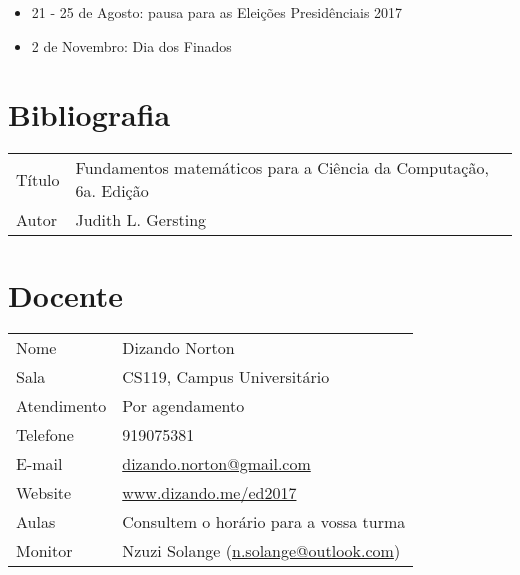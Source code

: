 \begin{itemize}
  \item 21 - 25 de Agosto: pausa para as Eleições Presidênciais 2017
  \item 2 de Novembro: Dia dos Finados
\end{itemize}

\section*{Bibliografia}

\begin{table}[H]
	\begin{tabular}{ll}%
		Título & Fundamentos matemáticos para a Ciência da Computação, 6a. Edição\\
		Autor & Judith L. Gersting\\
	\end{tabular}
\end{table}

\section*{Docente}

\begin{table}[H]
	\begin{tabular}{ll}%
		Nome 			& Dizando Norton \\ 
	    Sala			& CS119, Campus Universitário\\
	    Atendimento 	& Por agendamento \\
	    Telefone		& 919075381\\
	    E-mail			& \url{dizando.norton@gmail.com}\\
	    Website			& \url{www.dizando.me/ed2017}\\
	    Aulas 			& Consultem o horário para a vossa turma\\
	    Monitor			& Nzuzi Solange (\url{n.solange@outlook.com})\\
	\end{tabular}
\end{table}






